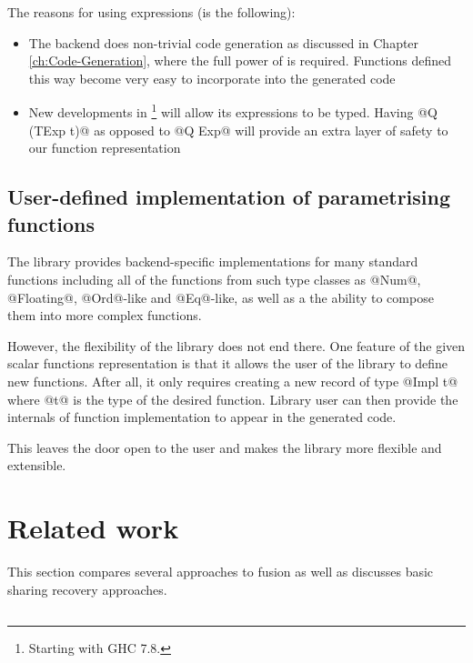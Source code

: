 \documentclass[preamble.tex]{subfiles}
\begin{document}
The reasons for using  expressions (is the following):
\begin{itemize}
\item The backend does non-trivial code generation as discussed in Chapter \ref{ch:Code-Generation}, where the full power of  is required. Functions defined this way become very easy to incorporate into the generated code
\item New developments in \footnote{Starting with GHC 7.8.} will allow its expressions to be typed. Having @Q (TExp t)@ as opposed to @Q Exp@ will provide an extra layer of safety to our function representation
\end{itemize}


\subsection{User-defined implementation of parametrising functions}

The library provides backend-specific implementations for many standard functions including all of the functions from such type classes as @Num@, @Floating@, @Ord@-like and @Eq@-like, as well as a the ability to compose them into more complex functions.

However, the flexibility of the library does not end there. One feature of the given scalar functions representation is that it allows the user of the library to define new functions. After all, it only requires creating a new record of type @Impl t@ where @t@ is the type of the desired function. Library user can then provide the internals of function implementation to appear in the generated code.

This leaves the door open to the user and makes the library more flexible and extensible.


\clearpage
\section{Related work}

This section compares several approaches to fusion as well as discusses basic sharing recovery approaches.


\subsection{}
\label{sec:DESOLA}
\end{document}
